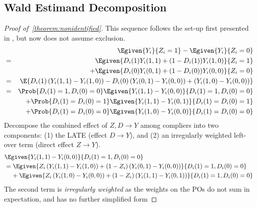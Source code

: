 \subsection{Wald Estimand Decomposition}
\begin{proof}[Proof of~\autoref{theorem:nonidentified}]
    \label{proof:nonidentified}
    This sequence follows the set-up first presented in \citet[Section~2]{imbens1994identification}, but now does not assume exclusion.
    \begin{align*}
        & &\Egiven{Y_i}{Z_i = 1} - \Egiven{Y_i}{Z_i = 0} \\
        &=& \Egiven{D_i(1) Y_i(1,1) + (1 - D_i(1)) Y_i(1,0)}{Z_i = 1} \\
        &&+ \Egiven{D_i(0) Y_i(0,1) + (1 - D_i(0)) Y_i(0,0)}{Z_i = 0} \\
        &=& \E{D_i(1) \left(Y_i(1,1) - Y_i(1,0)\right)
                - D_i(0) \left(Y_i(0,1) - Y_i(0,0)\right)
                + \left(Y_i(1,0) - Y_i(0,0)\right)} \\
        &=& \Prob{D_i(1) = 1, D_i(0) = 0}
            \Egiven{Y_i(1,1) - Y_i(0,0)}{D_i(1) = 1, D_i(0) = 0} \\
            &&+ \Prob{D_i(1) = D_i(0) = 1}
                \Egiven{Y_i(1,1) - Y_i(0,1)}{D_i(1) = D_i(0) = 1} \\
            &&+ \Prob{D_i(1) = D_i(0) = 0}
                \Egiven{Y_i(1,0) - Y_i(0,0)}{D_i(1) = D_i(0) = 0}
    \end{align*}
    Decompose the combined effect of  $Z,D \to Y$ among compliers into two components: (1) the LATE (effect $D \to Y$), and (2) an irregularly weighted left-over term (direct effect $Z \to Y$).
    \begin{align*}
        &\Egiven{Y_i(1,1) - Y_i(0,0)}{D_i(1) = 1, D_i(0) = 0} \\
        &=
        \Egiven{ Z_i \left(Y_i(1, 1) - Y_i(1, 0) \right)
            + (1 - Z_i) \left(Y_i(0, 1) - Y_i(0, 0) \right)}{
                D_i(1) = 1, D_i(0) = 0} \\
        &\;\;\;\; + \Egiven{ Z_i \left(Y_i(1, 0) - Y_i(0, 0) \right)
            + (1 - Z_i) \left(Y_i(1, 1) - Y_i(0, 1) \right)}{
                D_i(1) = 1, D_i(0) = 0}
    \end{align*}
    The second term is \textit{irregularly weighted} as the weights on the POs do not sum in expectation, and has no further simplified form


\end{proof}
